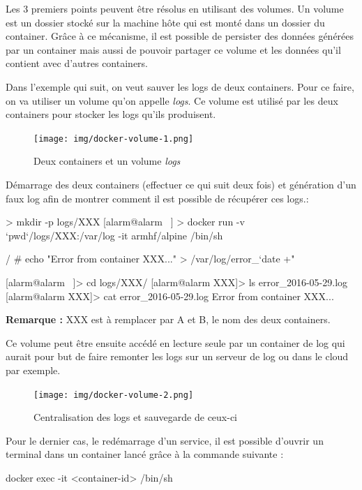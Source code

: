 \documentclass[11pt,a4paper,oneside]{report}
\begin{document}
Les 3 premiers points peuvent être résolus en utilisant des volumes. Un volume est un dossier stocké sur la machine hôte qui est monté dans un dossier du container. Grâce à ce mécanisme, il est possible de persister des données générées par un container mais aussi de pouvoir partager ce volume et les données qu'il contient avec d'autres containers.

Dans l'exemple qui suit, on veut sauver les logs de deux containers. Pour ce faire, on va utiliser un volume qu'on appelle \textit{logs}. Ce volume est utilisé par les deux containers pour stocker les logs qu'ils produisent.

\begin{figure}[H]
\centering
\texttt{[image: img/docker-volume-1.png]}
\caption{Deux containers et un volume \textit{logs}}
\end{figure}

Démarrage des deux containers (effectuer ce qui suit deux fois) et génération d'un faux log afin de montrer comment il est possible de récupérer ces logs.:
\begin{textcode}
 > mkdir -p logs/XXX
[alarm@alarm ~] > docker run -v `pwd`/logs/XXX:/var/log -it armhf/alpine /bin/sh

/ # echo "Error from container XXX..." > /var/log/error_`date +"%

[alarm@alarm ~]> cd logs/XXX/
[alarm@alarm XXX]> ls
error_2016-05-29.log
[alarm@alarm XXX]> cat error_2016-05-29.log 
Error from container XXX...
\end{textcode}

\textbf{Remarque :} XXX est à remplacer par A et B, le nom des deux containers.

Ce volume peut être ensuite accédé en lecture seule par un container de log qui aurait pour but de faire remonter les logs sur un serveur de log ou dans le cloud par exemple.

\begin{figure}[H]
\centering
\texttt{[image: img/docker-volume-2.png]}
\caption{Centralisation des logs et sauvegarde de ceux-ci}
\end{figure}

Pour le dernier cas, le redémarrage d'un service, il est possible d'ouvrir un terminal dans un container lancé grâce à la commande suivante :
\begin{bashcode}
docker exec -it <container-id> /bin/sh
\end{bashcode}
\end{document}
